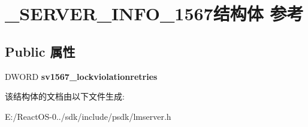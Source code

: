 \hypertarget{struct___s_e_r_v_e_r___i_n_f_o__1567}{}\section{\+\_\+\+S\+E\+R\+V\+E\+R\+\_\+\+I\+N\+F\+O\+\_\+1567结构体 参考}
\label{struct___s_e_r_v_e_r___i_n_f_o__1567}
\subsection*{Public 属性}
\begin{DoxyCompactItemize}
\item 
\mbox{\label{struct___s_e_r_v_e_r___i_n_f_o__1567_ad2bd832426c2933fe1435cbf89f76e6d}} 
D\+W\+O\+RD {\bfseries sv1567\+\_\+lockviolationretries}
\end{DoxyCompactItemize}


该结构体的文档由以下文件生成\+:\begin{DoxyCompactItemize}
\item 
E\+:/\+React\+O\+S-\/0../sdk/include/psdk/lmserver.\+h\end{DoxyCompactItemize}

